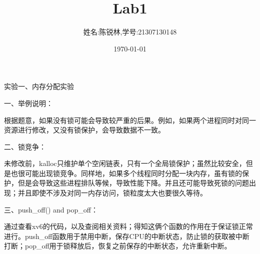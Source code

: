 \documentclass[12pt]{article}
\title{Lab1}
\author{姓名:陈锐林,学号:21307130148}
\date{\today}
\begin{document}
\maketitle
\begin{Large}
    \noindent 实验一、内存分配实验\\
\end{Large}
\begin{large}
    \noindent 一、举例说明：\\
\end{large}
\hspace*{2em}根据题意，如果没有锁可能会导致较严重的后果。例如，如果两个进程同时对同一资源进行修改，又没有锁保护，会导致数据不一致。\\

\begin{large}
    \noindent 二、锁竞争：\\
\end{large}
\hspace*{2em}未修改前，kalloc只维护单个空闲链表，只有一个全局锁保护；虽然比较安全，但是也很可能出现锁竞争。同样地，如果多个线程同时分配一块内存，虽有锁的保护，但是会导致这些进程排队等候，导致性能下降。并且还可能导致死锁的问题出现；并且即使不涉及对同一内存访问，锁粒度太大也要很久等待。\\

\begin{large}
    \noindent 三、push\_off() and pop\_off：\\
\end{large}
\hspace*{2em}通过查看xv6的代码，以及查阅相关资料；得知这俩个函数的作用在于保证锁正常进行。push\_off函数用于禁用中断，保存CPU的中断状态，防止锁的获取被中断打断；pop\_off用于锁释放后，恢复之前保存的中断状态，允许重新中断。\\
\end{document}

